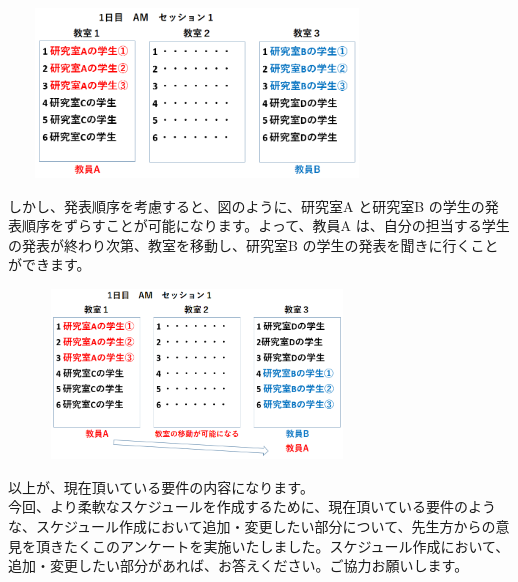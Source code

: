 \documentclass[a4j]{jarticle}
\begin{document}
 \begin{center}
    \includegraphics[width=10cm,height=4.5cm,]{BeforeOrder.PNG}
  \end{center}

 しかし、発表順序を考慮すると、図のように、研究室A と研究室B の学生の発表順序をずらすことが可能になります。よって、教員A は、自分の担当する学生の発表が終わり次第、教室を移動し、研究室B の学生の発表を聞きに行くことができます。

 \begin{center}
    \includegraphics[width=10cm,height=4.5cm,]{AfterOrder.PNG}
  \end{center}

 以上が、現在頂いている要件の内容になります。\\
 
  
今回、より柔軟なスケジュールを作成するために、現在頂いている要件のような、スケジュール作成において追加・変更したい部分について、先生方からの意見を頂きたくこのアンケートを実施いたしました。スケジュール作成において、追加・変更したい部分があれば、お答えください。ご協力お願いします。
\end{document}
